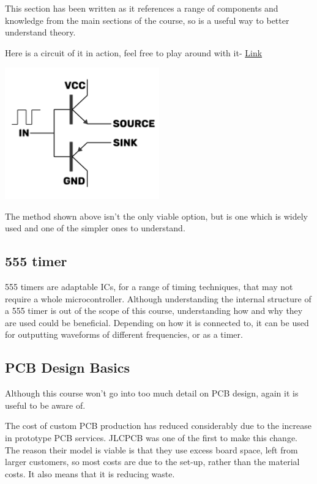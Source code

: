 \documentclass[a4paper,11pt]{report}
\begin{document}
This section has been written as it references a range of components and knowledge from the main sections of the course, so is a useful way to better understand theory.

Here is a circuit of it in action, feel free to play around with it- \href{https://tinyurl.com/2m77d6zl}{Link}

\includegraphics[width=0.5\textwidth]{gatedriver1}

The method shown above isn't the only viable option, but is one which is widely used and one of the simpler ones to understand.

\subsection{555 timer}

555 timers are adaptable ICs, for a range of timing techniques, that may not require a whole microcontroller. Although understanding the internal structure of a 555 timer is out of the scope of this course, understanding how and why they are used could be beneficial.
Depending on how it is connected to, it can be used for outputting waveforms of different frequencies, or as a timer.

\subsection{PCB Design Basics}

Although this course won't go into too much detail on PCB design, again it is useful to be aware of.

The cost of custom PCB production has reduced considerably due to the increase in prototype PCB services. JLCPCB was one of the first to make this change. The reason their model is viable is that they use excess board space, left from larger customers, so most costs are due to the set-up, rather than the material costs. It also means that it is reducing waste.
\end{document}
